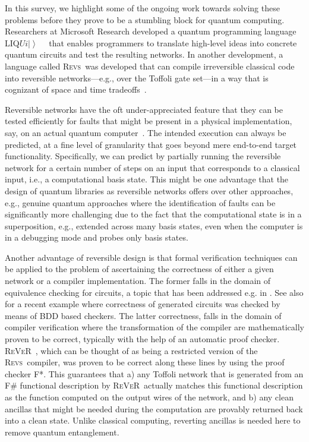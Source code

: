 \documentclass[conference]{IEEEtran}
\newcommand{\ket}[1]{\left| #1\right\rangle}        %
\newcommand{\Liquid}{LIQ$Ui\ket{}$\ }
\newcommand{\REVS}{{\textsc{Revs}}}
\newcommand{\REVER}{{\textsc{ReVeR}}}
\begin{document}
In this survey, we highlight some of the ongoing work towards solving these problems before they prove to be a stumbling block for quantum computing. Researchers at Microsoft Research developed a quantum programming language \Liquid~\cite{WS:2014} that enables programmers to translate high-level ideas into concrete quantum circuits and test the resulting networks. In another development, a language called \REVS~was developed that can compile irreversible classical code into reversible networks---e.g., over the Toffoli gate set---in a way that is cognizant of space and time tradeoffs~\cite{PRS15}. 

Reversible networks have the oft under-appreciated feature that they can be tested efficiently for faults that might be present in a physical implementation, say, on an actual quantum computer~\cite{HRS16}. The intended execution can always be predicted, at a fine level of granularity that goes beyond mere end-to-end target functionality.  Specifically, we can predict by partially running the reversible network for a certain number of steps on an input that corresponds to a classical input, i.e., a computational basis state. This might be one advantage that the design of quantum libraries as reversible networks offers over other approaches, e.g., genuine quantum approaches where the identification of faults can be significantly more challenging due to the fact that the computational state is in a superposition, e.g., extended across many basis states, even when the computer is in a debugging mode and probes only basis states. 

Another advantage of reversible design is that formal verification techniques can be applied to the problem of ascertaining the correctness of either a given network or a compiler implementation. The former falls in the domain of equivalence checking for circuits, a topic that has been addressed e.g. in \cite{VMH:2007}. See also \cite{SRWD:2017} for a recent example where correctness of generated circuits was checked by means of BDD based checkers.  The latter correctness, falls in the domain of compiler verification where the transformation of the compiler are mathematically proven to be correct, typically with the help of an automatic proof checker. \REVER~\cite{ARS16}, which can be thought of as being a restricted version of the \REVS~compiler, was proven to be correct along these lines by using the proof checker F*.  This guarantees that a) any Toffoli network that is generated from an F\# functional description by \REVER~actually matches this functional description as the function computed on the output wires of the network, and b) any clean ancillas that might be needed during the computation are provably returned back into a clean state. Unlike classical computing, reverting ancillas is needed here to remove quantum entanglement.
\end{document}
